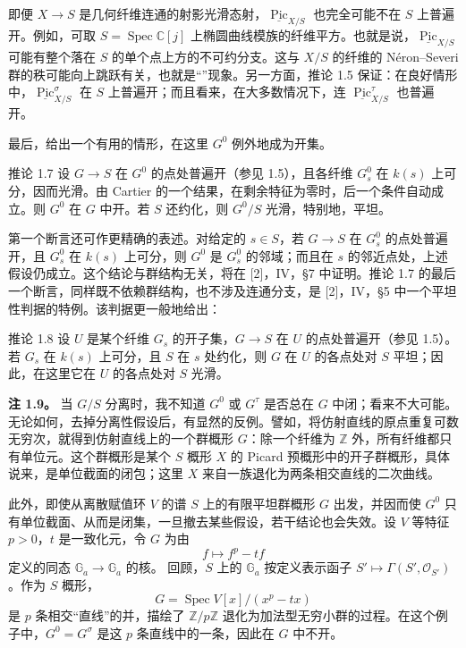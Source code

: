 即便 $X\to S$ 是几何纤维连通的射影光滑态射，$\underline{\operatorname{Pic}}_{X/S}$ 也完全可能不在 $S$ 上普遍开。例如，可取 $S=\operatorname{Spec}\mathbb C[j]$ 上椭圆曲线模族的纤维平方。也就是说，$\underline{\operatorname{Pic}}_{X/S}$ 可能有整个落在 $S$ 的单个点上方的不可约分支。这与 $X/S$ 的纤维的 Néron--Severi 群的秩可能向上跳跃有关，也就是“”现象。另一方面，推论 1.5 保证：在良好情形中，$\underline{\operatorname{Pic}}^\sigma_{X/S}$ 在 $S$ 上普遍开；而且看来，在大多数情况下，连 $\underline{\operatorname{Pic}}^\tau_{X/S}$ 也普遍开。

最后，给出一个有用的情形，在这里 $G^0$ 例外地成为开集。
\begin{statement}{推论 1.7}
设 $G\to S$ 在 $G^0$ 的点处普遍开（参见 1.5），且各纤维 $G_s^0$ 在 $k(s)$ 上可分，因而光滑。由 Cartier 的一个结果，在剩余特征为零时，后一个条件自动成立。则 $G^0$ 在 $G$ 中开。若 $S$ 还约化，则 $G^0/S$ 光滑，特别地，平坦。
\end{statement}

第一个断言还可作更精确的表述。对给定的 $s\in S$，若 $G\to S$ 在 $G_s^0$ 的点处普遍开，且 $G_s^0$ 在 $k(s)$ 上可分，则 $G^0$ 是 $G_s^0$ 的邻域；而且在 $s$ 的邻近点处，上述假设仍成立。这个结论与群结构无关，将在 [2]，IV，\S7 中证明。推论 1.7 的最后一个断言，同样既不依赖群结构，也不涉及连通分支，是 [2]，IV，\S5 中一个平坦性判据的特例。该判据更一般地给出：

\begin{statement}{推论 1.8}
设 $U$ 是某个纤维 $G_s$ 的开子集，$G\to S$ 在 $U$ 的点处普遍开（参见 1.5）。若 $G_s$ 在 $k(s)$ 上可分，且 $S$ 在 $s$ 处约化，则 $G$ 在 $U$ 的各点处对 $S$ 平坦；因此，在这里它在 $U$ 的各点处对 $S$ 光滑。
\end{statement}

\textbf{注 1.9。} 当 $G/S$ 分离时，我不知道 $G^0$ 或 $G^\tau$ 是否总在 $G$ 中闭；看来不大可能。无论如何，去掉分离性假设后，有显然的反例。譬如，将仿射直线的原点重复可数无穷次，就得到仿射直线上的一个群概形 $G$：除一个纤维为 $\mathbb Z$ 外，所有纤维都只有单位元。这个群概形是某个 $S$ 概形 $X$ 的 Picard 预概形中的开子群概形，具体说来，是单位截面的闭包；这里 $X$ 来自一族退化为两条相交直线的二次曲线。

此外，即使从离散赋值环 $V$ 的谱 $S$ 上的有限平坦群概形 $G$ 出发，并因而使 $G^0$ 只有单位截面、从而是闭集，一旦撤去某些假设，若干结论也会失效。设 $V$ 等特征 $p>0$，$t$ 是一致化元，令 $G$ 为由
\[
 f\longmapsto f^p-tf
\]
定义的同态 $\mathbb G_a\to\mathbb G_a$ 的核。
回顾，$S$ 上的 $\mathbb G_a$ 按定义表示函子 $S'\mapsto\Gamma(S',\mathcal O_{S'})$。作为 $S$ 概形，
\[
 G=\operatorname{Spec}V[x]/(x^p-tx)
\]
是 $p$ 条相交“直线”的并，描绘了 $\mathbb Z/p\mathbb Z$ 退化为加法型无穷小群的过程。在这个例子中，$G^0=G^\sigma$ 是这 $p$ 条直线中的一条，因此在 $G$ 中不开。

